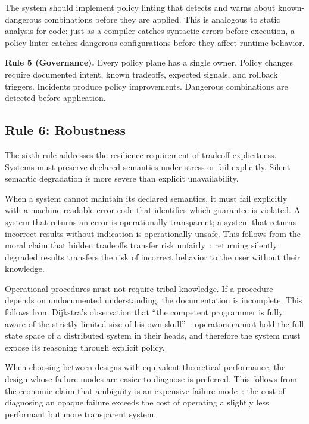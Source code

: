\documentclass[conference]{IEEEtran}
\begin{document}
The system should implement policy linting that detects and warns about known-dangerous combinations before they are applied. This is analogous to static analysis for code: just as a compiler catches syntactic errors before execution, a policy linter catches dangerous configurations before they affect runtime behavior.

\textbf{Rule 5 (Governance).} Every policy plane has a single owner. Policy changes require documented intent, known tradeoffs, expected signals, and rollback triggers. Incidents produce policy improvements. Dangerous combinations are detected before application.

\subsection{Rule 6: Robustness}

The sixth rule addresses the resilience requirement of tradeoff-explicitness. Systems must preserve declared semantics under stress or fail explicitly. Silent semantic degradation is more severe than explicit unavailability.

When a system cannot maintain its declared semantics, it must fail explicitly with a machine-readable error code that identifies which guarantee is violated. A system that returns an error is operationally transparent; a system that returns incorrect results without indication is operationally unsafe. This follows from the moral claim that hidden tradeoffs transfer risk unfairly~\cite{leveson}: returning silently degraded results transfers the risk of incorrect behavior to the user without their knowledge.

Operational procedures must not require tribal knowledge. If a procedure depends on undocumented understanding, the documentation is incomplete. This follows from Dijkstra's observation that ``the competent programmer is fully aware of the strictly limited size of his own skull''~\cite{dijkstra1972humble}: operators cannot hold the full state space of a distributed system in their heads, and therefore the system must expose its reasoning through explicit policy.

When choosing between designs with equivalent theoretical performance, the design whose failure modes are easier to diagnose is preferred. This follows from the economic claim that ambiguity is an expensive failure mode~\cite{simon}: the cost of diagnosing an opaque failure exceeds the cost of operating a slightly less performant but more transparent system.
\end{document}
